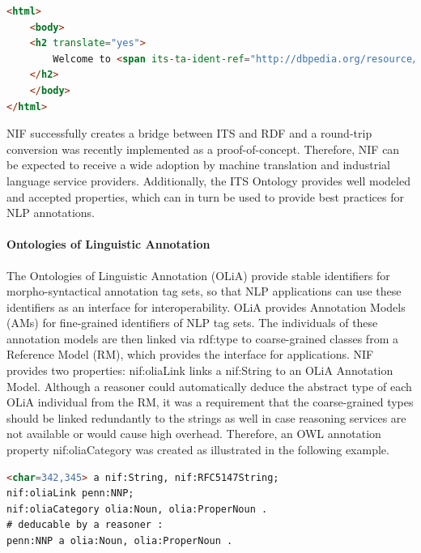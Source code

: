 \documentclass[thesis=M,english,hidelinks]{FITthesis}[2019/12/23]
\begin{document}
\begin{lstlisting}[language=HTML, caption=Example of Internationalization Tag Set HTML Code, label = {lst:its-example}]
<html> 
	<body>
	<h2 translate="yes"> 
		Welcome to <span its-ta-ident-ref="http://dbpedia.org/resource/Dublin" its-within- text="yes" translate ="no"> Dublin </span> in <b translate ="no" its-within-text="yes"> Ireland </b>! 
	</h2> 
	</body> 
</html>
\end{lstlisting}

NIF successfully creates a bridge between ITS and RDF and a round-trip conversion was recently implemented as a proof-of-concept. Therefore, NIF can be expected to receive a wide adoption by machine translation and industrial language service providers. Additionally, the ITS Ontology provides well modeled and accepted properties, which can in turn be used to provide best practices for NLP annotations.

\paragraph{Ontologies of Linguistic Annotation}

The Ontologies of Linguistic Annotation (OLiA) provide stable identifiers for morpho-syntactical annotation tag sets, so that NLP applications can use these identifiers as an interface for interoperability. OLiA provides Annotation Models (AMs) for fine-grained identifiers of NLP tag sets. The
individuals of these annotation models are then linked via rdf:type to coarse-grained classes from a Reference Model (RM), which provides the interface for applications. NIF provides two properties: nif:oliaLink links a nif:String to an OLiA Annotation Model. Although a reasoner could automatically deduce the abstract type of each OLiA individual from the RM, it was a requirement that the coarse-grained types should be linked redundantly to the strings as well in case reasoning services are not available or would cause high overhead. Therefore, an OWL annotation property nif:oliaCategory was created as illustrated in the following example\cite{lst:olia-example}.

\begin{lstlisting}[language=HTML, caption=Example of Internationalization Tag Set HTML Code, label = {lst:olia-example}]
<char=342,345> a nif:String, nif:RFC5147String;
nif:oliaLink penn:NNP;
nif:oliaCategory olia:Noun, olia:ProperNoun .
# deducable by a reasoner :
penn:NNP a olia:Noun, olia:ProperNoun .
\end{lstlisting}
\end{document}
